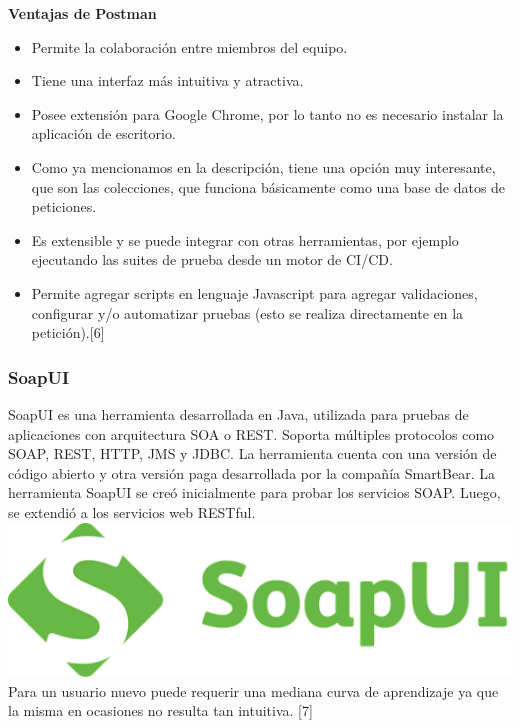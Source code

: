 \documentclass[twocolumn]{article}
\begin{document}
\newpage
\textbf{Ventajas de Postman}
\begin{itemize}
  \item Permite la colaboración entre miembros del equipo.
  \item Tiene una interfaz más intuitiva y atractiva.
  \item Posee extensión para Google Chrome,  por lo tanto no es necesario instalar la aplicación de escritorio.
  \item Como ya mencionamos en la descripción, tiene una opción muy interesante, que son las colecciones, que funciona básicamente como una base de datos de peticiones.
  \item Es extensible y se puede integrar con otras herramientas, por ejemplo ejecutando las suites de prueba desde un motor  de CI/CD.
  \item Permite agregar scripts en lenguaje Javascript para agregar validaciones, configurar y/o automatizar pruebas (esto se realiza directamente en la petición).[6]
\end{itemize}

\subsubsection{SoapUI }
SoapUI es una herramienta desarrollada en Java, utilizada para pruebas de aplicaciones con arquitectura SOA o REST. Soporta múltiples protocolos como SOAP, REST, HTTP, JMS y JDBC. La herramienta cuenta con una versión de código abierto y otra versión paga desarrollada por la compañía SmartBear.
La herramienta SoapUI se creó inicialmente para probar los servicios SOAP. Luego, se extendió a los servicios web RESTful. \\
\includegraphics[width=1.02\linewidth]{img/foto5}
\\Para un usuario nuevo puede requerir una mediana curva de aprendizaje ya que la misma en ocasiones no resulta tan intuitiva.
[7]
\end{document}
